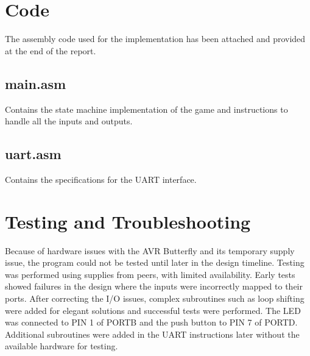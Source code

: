 \documentclass[usletter, 12pt]{article}
\begin{document}
    \section{Code} \label{sec:code}

        The assembly code used for the implementation has been attached and provided at the end of the report.

        \subsection{main.asm}
        Contains the state machine implementation of the game and instructions to handle all the inputs and outputs.

        \subsection{uart.asm}
        Contains the specifications for the UART interface.

    \section{Testing and Troubleshooting}

        Because of hardware issues with the AVR Butterfly and its temporary supply issue, the program could not be tested until later in the design timeline. Testing was performed using supplies from peers, with limited availability. Early tests showed failures in the design where the inputs were incorrectly mapped to their ports. After correcting the I/O issues, complex subroutines such as loop shifting were added for elegant solutions and successful tests were performed. The LED was connected to PIN 1 of PORTB and the push button to PIN 7 of PORTD. Additional subroutines were added in the UART instructions later without the available hardware for testing.

    \newpage

    \newpage
\end{document}
